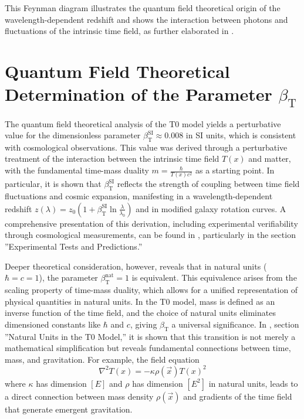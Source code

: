 \documentclass[12pt,a4paper]{article}
\newcommand{\Tfield}{T(x)}
\newcommand{\betaT}{\beta_{\text{T}}}
\newcommand{\vecx}{\vec{x}}
\begin{document}
	This Feynman diagram illustrates the quantum field theoretical origin of the wavelength-dependent redshift and shows the interaction between photons and fluctuations of the intrinsic time field, as further elaborated in \cite{pascher_feldtheorie_2025}.
	
	\section{Quantum Field Theoretical Determination of the Parameter \(\betaT\)}
	\label{sec:quantum_theoretical}
	
	The quantum field theoretical analysis of the T0 model yields a perturbative value for the dimensionless parameter \(\betaT^{\text{SI}} \approx 0.008\) in SI units, which is consistent with cosmological observations. This value was derived through a perturbative treatment of the interaction between the intrinsic time field \(\Tfield\) and matter, with the fundamental time-mass duality \(m = \frac{\hbar}{\Tfield c^2}\) as a starting point. In particular, it is shown that \(\betaT^{\text{SI}}\) reflects the strength of coupling between time field fluctuations and cosmic expansion, manifesting in a wavelength-dependent redshift \(z(\lambda) = z_0 \left(1 + \betaT^{\text{SI}} \ln \frac{\lambda}{\lambda_0}\right)\) and in modified galaxy rotation curves. A comprehensive presentation of this derivation, including experimental verifiability through cosmological measurements, can be found in \cite{pascher_emergente_gravitation_2025}, particularly in the section ''Experimental Tests and Predictions.''
	
	Deeper theoretical consideration, however, reveals that in natural units (\(\hbar = c = 1\)), the parameter \(\betaT^{\text{nat}} = 1\) is equivalent. This equivalence arises from the scaling property of time-mass duality, which allows for a unified representation of physical quantities in natural units. In the T0 model, mass is defined as an inverse function of the time field, and the choice of natural units eliminates dimensioned constants like \(\hbar\) and \(c\), giving \(\betaT\) a universal significance. In \cite{pascher_emergente_gravitation_2025}, section ''Natural Units in the T0 Model,'' it is shown that this transition is not merely a mathematical simplification but reveals fundamental connections between time, mass, and gravitation. For example, the field equation
	\begin{equation}
		\nabla^2 \Tfield = -\kappa \rho(\vecx) \Tfield^2
	\end{equation}
	where \(\kappa\) has dimension \([E]\) and \(\rho\) has dimension \([E^2]\) in natural units, leads to a direct connection between mass density \(\rho(\vecx)\) and gradients of the time field that generate emergent gravitation.
	
\end{document}

